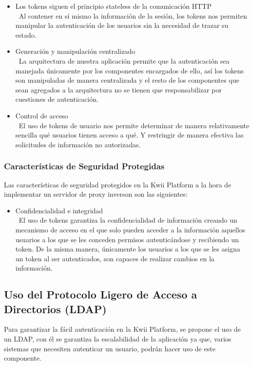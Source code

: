 \begin{itemize}
    \item Los tokens siguen el principio stateless de la comunicación HTTP\\\
    Al contener en sí mismo la información de la sesión, los tokens nos permiten manipular la autenticación de los usuarios sin la necesidad de trazar su estado.
    \item Generación y manipulación centralizado\\\
    La arquitectura de nuestra aplicación permite que la autenticación sea manejada únicamente por los componentes encargados de ello, así los tokens son manipuladas de manera centralizada y el resto de los componentes que sean agregados a la arquitectura no se tienen que responsabilizar por cuestiones de autenticación.
    \item Control de acceso\\\
    El uso de tokens de usuario nos permite determinar de manera relativamente sencilla qué usuarios tienen acceso a qué. Y restringir de manera efectiva las solicitudes de información no autorizadas.
\end{itemize}

\subsubsection{Características de Seguridad Protegidas}
Las características de seguridad protegidos en la Kwii Platform a la hora de implementar un servidor de proxy inverson son las siguientes:
\begin{itemize}
    \item Confidencialidad e integridad\\\
    El uso de tokens garantiza la confidencialidad de información creando un mecanismo de acceso en el que solo pueden acceder a la información aquellos usuarios a los que se les conceden permisos autenticándose y recibiendo un token. De la misma manera, únicamente los usuarios a los que se les asigna un token al ser autenticados, son capaces de realizar cambios en la información.
\end{itemize}

\subsection{Uso del Protocolo Ligero de Acceso a Directorios (LDAP)}

Para garantizar la fácil autenticación en la Kwii Platform, se propone el uso de un LDAP, con él se garantiza la escalabilidad de la aplicación ya que, varios sistemas que necesiten autenticar un usuario, podrán hacer uso de este componente.



